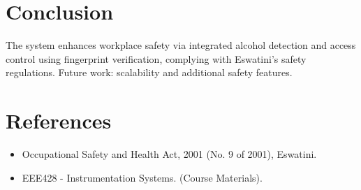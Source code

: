 \documentclass[a4paper,12pt]{article}
\begin{document}
\section{Conclusion}
The system enhances workplace safety via integrated alcohol detection and access control using fingerprint verification, complying with Eswatini's safety regulations. Future work: scalability and additional safety features.

\section{References}
\begin{itemize}
    \item Occupational Safety and Health Act, 2001 (No. 9 of 2001), Eswatini.
    \item EEE428 - Instrumentation Systems. (Course Materials).
\end{itemize}
\end{document}
